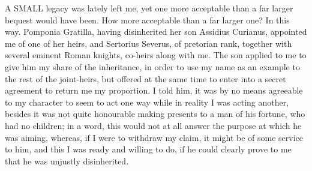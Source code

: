 
A SMALL legacy was lately left me, yet one more acceptable than a far
larger bequest would have been. How more acceptable than a far larger one?
In this way. Pomponia Gratilla, having disinherited her son Assidius
Curianus, appointed me of one of her heirs, and Sertorius Severus, of
pretorian rank, together with several eminent Roman knights, co-heirs
along with me. The son applied to me to give him my share of the
inheritance, in order to use my name as an example to the rest of the
joint-heirs, but offered at the same time to enter into a secret agreement
to return me my proportion. I told him, it was by no means agreeable to my
character to seem to act one way while in reality I was acting another,
besides it was not quite honourable making presents to a man of his
fortune, who had no children; in a word, this would not at all answer the
purpose at which he was aiming, whereas, if I were to withdraw my claim,
it might be of some service to him, and this I was ready and willing to
do, if he could clearly prove to me that he was unjustly disinherited.

